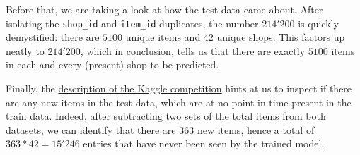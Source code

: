 Before that, we are taking a look at how the test data came about. After isolating the \texttt{shop\_id} and \texttt{item\_id} duplicates, the number $214'200$ is quickly demystified: there are $5100$ unique items and $42$ unique shops. This factors up neatly to $214'200$, which in conclusion, tells us that there are exactly $5100$ items in each and every (present) shop to be predicted.

Finally, the \href{https://www.kaggle.com/c/competitive-data-science-predict-future-sales/data}{description of the Kaggle competition} hints at us to inspect if there are any new items in the test data, which are at no point in time present in the train data. Indeed, after subtracting two sets of the total items from both datasets, we can identify that there are $363$ new items, hence a total of $363*42=15'246$ entries that have never been seen by the trained model.
